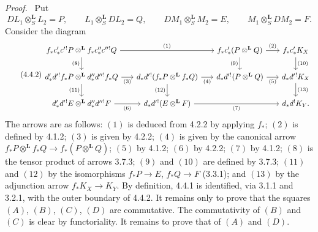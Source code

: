 \documentclass[11pt]{article}
\newenvironment{prooftext}[1][Proof]{\par\noindent\emph{#1.}\ }{\par\medskip}
\begin{document}
\begin{prooftext}[Proof]
Put
\[
DL_1\otimes_S^{\mathbf L}L_2=P,\qquad
L_1\otimes_S^{\mathbf L}DL_2=Q,\qquad
DM_1\otimes_S^{\mathbf L}M_2=E,\qquad
M_1\otimes_S^{\mathbf L}DM_2=F.
\]
Consider the diagram
\begin{equation}
\tag{4.4.2}
\begin{tikzcd}[column sep=1.6em,row sep=1.7em]
f_*c'_*c'{}^!P\otimes^{\mathbf L} f_*c''_*c''{}^!Q
 \arrow[rr,"(1)"] \arrow[d,"(8)"'] &&
f_*c'_*(P\otimes^{\mathbf L}Q)
 \arrow[r,"(2)"] \arrow[d,"(9)"'] &
f_*c'_*K_X \arrow[d,"(10)"] \\
d'_*d'{}^!f_*P\otimes^{\mathbf L} d''_*d''{}^!f_*Q
 \arrow[r,"(3)"'] \arrow[d,"(11)"'] &
d_*d'{}^!(f_*P\otimes^{\mathbf L} f_*Q)
 \arrow[r,"(4)"'] \arrow[d,"(12)"'] &
d_*d'{}^!(P\otimes^{\mathbf L}Q)
 \arrow[r,"(5)"'] &
d_*d'{}^!K_X \arrow[d,"(13)"]\\
d'_*d'{}^!E\otimes^{\mathbf L}d''_*d''{}^!F
 \arrow[r,"(6)"'] &
d_*d'{}^!(E\otimes^{\mathbf L}F)
 \arrow[rr,"(7)"'] &&
d_*d^!K_Y .
\end{tikzcd}
\end{equation}
The arrows are as follows: $(1)$ is deduced from 4.2.2 by applying $f_*$; $(2)$ is defined by 4.1.2; $(3)$ is given by 4.2.2; $(4)$ is given by the canonical arrow $f_*P\otimes^{\mathbf L}f_*Q\longrightarrow f_*(P\otimes^{\mathbf L}Q)$; $(5)$ by 4.1.2; $(6)$ by 4.2.2; $(7)$ by 4.1.2; $(8)$ is the tensor product of arrows 3.7.3; $(9)$ and $(10)$ are defined by 3.7.3; $(11)$ and $(12)$ by the isomorphisms $f_*P\longrightarrow E$, $f_*Q\longrightarrow F$ (3.3.1); and $(13)$ by the adjunction arrow $f_*K_X\longrightarrow K_Y$. By definition, 4.4.1 is identified, via 3.1.1 and 3.2.1, with the outer boundary of 4.4.2. It remains only to prove that the squares $(A)$, $(B)$, $(C)$, $(D)$ are commutative. The commutativity of $(B)$ and $(C)$ is clear by functoriality. It remains to prove that of $(A)$ and $(D)$.


\end{prooftext}
\end{document}
